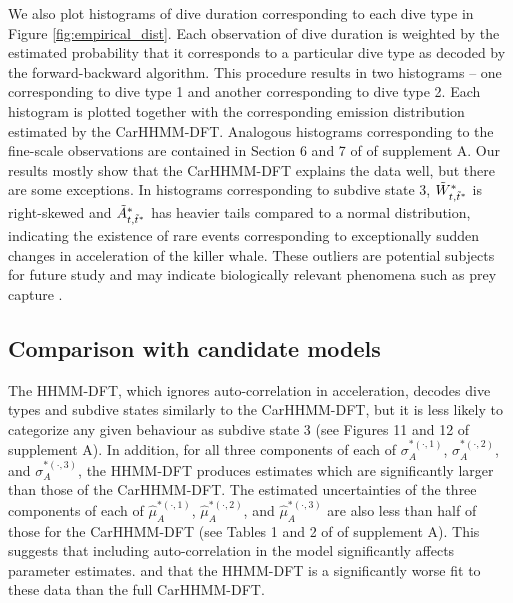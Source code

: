 We also plot histograms of dive duration corresponding to each dive type in Figure \ref{fig:empirical_dist}. Each observation of dive duration is weighted by the estimated probability that it corresponds to a particular dive type as decoded by the %
forward-backward algorithm. This procedure results in two histograms -- one corresponding to dive type 1 and another corresponding to dive type 2. Each histogram is plotted together with the corresponding emission distribution estimated by the CarHHMM-DFT. Analogous histograms corresponding to the fine-scale observations are contained in Section 6 and 7 of of supplement A. Our results mostly show that the CarHHMM-DFT explains the data well, but there are some exceptions. In histograms corresponding to subdive state 3, $\tilde{W}^*_{t,\tilde t^*}$ is right-skewed and $\tilde{A}^*_{t,\tilde t^*}$ has heavier tails compared to a normal distribution, indicating the existence of rare events corresponding to exceptionally sudden changes in acceleration of the killer whale. These outliers are potential subjects for future study and may indicate biologically relevant phenomena such as prey capture \citep{Tennessen:2019a}.

\subsection{Comparison with candidate models}

The HHMM-DFT, which ignores auto-correlation in acceleration, decodes dive types and subdive states similarly to the CarHHMM-DFT, but it is less likely to categorize 
any given behaviour as subdive state 3
(see Figures 11 and 12 of supplement A). In addition, for all three components of each of $\sigma_A^{*(\cdot,1)}$, $\sigma_A^{*(\cdot,2)}$, and $\sigma_A^{*(\cdot,3)}$, the HHMM-DFT produces estimates which are %
significantly larger than those of the CarHHMM-DFT. The estimated uncertainties of the three components of each of $\hat \mu_A^{*(\cdot,1)}$, $\hat \mu_A^{*(\cdot,2)}$, and $\hat \mu_A^{*(\cdot,3)}$ are also less than half of those for the CarHHMM-DFT (see Tables 1 and 2 of of supplement A). This suggests that including auto-correlation in the model significantly affects parameter estimates. %
and that the HHMM-DFT is a significantly worse fit to these data than the full CarHHMM-DFT.

